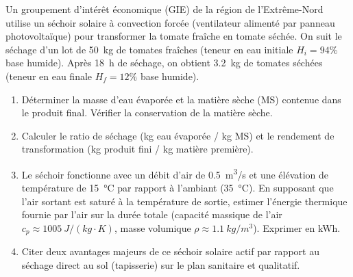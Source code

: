 \documentclass[11pt]{article}
\begin{document}
\begin{exercice}
\label{exo:sechage}
Un groupement d'intérêt économique (GIE) de la région de l'Extrême-Nord utilise un séchoir solaire à convection forcée (ventilateur alimenté par panneau photovoltaïque) pour transformer la tomate fraîche en tomate séchée. On suit le séchage d'un lot de \SI{50}{kg} de tomates fraîches (teneur en eau initiale $H_i = 94\%$ base humide). Après \SI{18}{h} de séchage, on obtient \SI{3,2}{kg} de tomates séchées (teneur en eau finale $H_f = 12\%$ base humide).
\begin{enumerate}
    \item Déterminer la masse d'eau évaporée et la matière sèche (MS) contenue dans le produit final. Vérifier la conservation de la matière sèche.
    \item Calculer le ratio de séchage (kg eau évaporée / kg MS) et le rendement de transformation (kg produit fini / kg matière première).
    \item Le séchoir fonctionne avec un débit d'air de \SI{0,5}{m^3/s} et une élévation de température de \SI{15}{\celsius} par rapport à l'ambiant (\SI{35}{\celsius}). En supposant que l'air sortant est saturé à la température de sortie, estimer l'énergie thermique fournie par l'air sur la durée totale (capacité massique de l'air $c_p \approx \SI{1005}{J/(kg\cdot K)}$, masse volumique $\rho \approx \SI{1,1}{kg/m^3}$). Exprimer en kWh.
    \item Citer deux avantages majeurs de ce séchoir solaire actif par rapport au séchage direct au sol (tapisserie) sur le plan sanitaire et qualitatif.
\end{enumerate}
\end{exercice}
\end{document}
